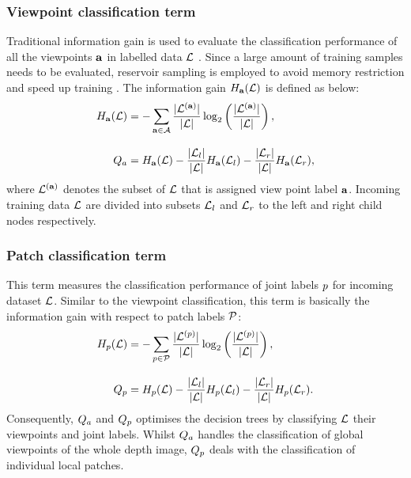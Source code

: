 \subsubsection{Viewpoint classification term} 
Traditional information gain is used to evaluate the classification performance of all the viewpoints $\mathbf{a}$ in labelled data $\mathcal{L}$ \cite{Breiman2001}.   
Since a large amount of training samples needs to be evaluated, reservoir sampling is employed to avoid memory restriction and speed up training \cite{Girshick2011}. The information gain $H_{\mathbf{a}}(\mathcal{L})$ is defined as below:
\begin{equation}
	\label{eqn/hand/viewterm}
	\begin{aligned}
		H_{\mathbf{a}}(\mathcal{L}) & = 
		- \displaystyle\sum_{\mathbf{a} \in \mathcal{A}} \frac{|\mathcal{L}^{(\mathbf{a})}|}{|\mathcal{L}|}\log_{2}\left(\frac{|\mathcal{L}^{(\mathbf{a})}|}{|\mathcal{L}|}\right), \\[3mm] 
		Q_{a} & = 
		H_{\mathbf{a}}(\mathcal{L}) - 
		\frac{|\mathcal{L}_{l}|}{|\mathcal{L}|} H_{\mathbf{a}}(\mathcal{L}_{l}) -  
		\frac{|\mathcal{L}_{r}|}{|\mathcal{L}|} H_{\mathbf{a}}(\mathcal{L}_{r}),
	\end{aligned}
\end{equation}
where $\mathcal{L}^{(\mathbf{a})}$ denotes the subset of $\mathcal{L}$ that is assigned view point label $\mathbf{a}$. Incoming training data $\mathcal{L}$ are divided into subsets $\mathcal{L}_{l}$ and $\mathcal{L}_{r}$ to the left and right child nodes respectively.  

\subsubsection{Patch classification term} 
This term measures the classification performance of joint labels $p$ for incoming dataset $\mathcal{L}$. Similar to the viewpoint classification, this term is basically the information gain with respect to patch labels $\mathcal{P}$:  
\begin{equation}
	\begin{aligned}	
		H_{p}(\mathcal{L}) & = 
		- \displaystyle\sum_{p \in \mathcal{P}} \frac{|\mathcal{L}^{(p)}|}{|\mathcal{L}|}\log_{2}\left(\frac{|\mathcal{L}^{(p)}|}{|\mathcal{L}|}\right), \\[3mm]
	Q_{p} & = 
	H_{p}(\mathcal{L}) - 
	\frac{|\mathcal{L}_{l}|}{|\mathcal{L}|} H_{p}(\mathcal{L}_{l}) -  
	\frac{|\mathcal{L}_{r}|}{|\mathcal{L}|} H_{p}(\mathcal{L}_{r}).
	\end{aligned}
	\label{eqn/hand/classterm}
\end{equation}
Consequently, $Q_{a}$ and $Q_{p}$ optimises the decision trees by classifying $\mathcal{L}$ their viewpoints and joint labels. Whilst $Q_{a}$ handles the classification of global viewpoints of the whole depth image, $Q_{p}$ deals with the classification of individual local patches. 

